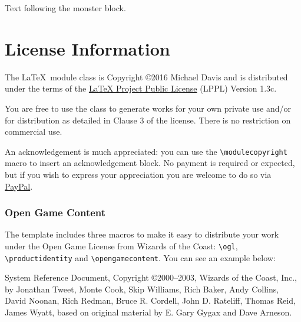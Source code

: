 \documentclass[letterpaper,serif]{module}
\begin{document}
Text following the monster block.

\part{License Information}

The \LaTeX~module class is Copyright \copyright 2016 Michael Davis and is distributed under the terms of the
\href{http://www.latex-project.org/lppl.txt}{LaTeX Project Public License} (LPPL) Version 1.3c.

You are free to use the class to generate works for your own private use and/or for distribution as detailed in
Clause 3 of the license. There is no restriction on commercial use.

An acknowledgement is much appreciated: you can use the \verb|\modulecopyright| macro to insert an acknowledgement
block. No payment is required or expected, but if you wish to express your appreciation you are welcome to do so via
\href{https://paypal.me/slithy}{PayPal}.

%
%

\section{Open Game Content}
\label{ogl}

The template includes three macros to make it easy to distribute your work under the Open Game License
from Wizards of the Coast: \verb|\ogl|, \verb|\productidentity| and \verb|\opengamecontent|. You can see
an example below:

\begin{ogl}
\item System Reference Document, Copyright \copyright 2000--2003, Wizards of the Coast, Inc., by Jonathan Tweet, Monte Cook,
Skip Williams, Rich Baker, Andy Collins, David Noonan, Rich Redman, Bruce R. Cordell, John D. Rateliff, Thomas Reid, James
Wyatt, based on original material by E. Gary Gygax and Dave Arneson.
\end{ogl}
\end{document}
